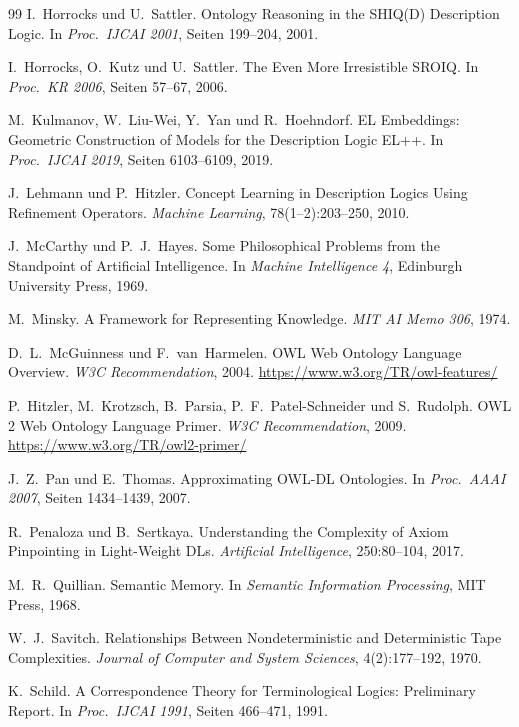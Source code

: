 ﻿\documentclass[a4paper,12pt]{article}
\theoremstyle{definition}
\theoremstyle{plain}
\theoremstyle{remark}
\begin{document}
\begin{thebibliography}{99}
I.~Horrocks und U.~Sattler.
Ontology Reasoning in the SHIQ(D) Description Logic.
In \textit{Proc.\ IJCAI 2001}, Seiten 199--204, 2001.

I.~Horrocks, O.~Kutz und U.~Sattler.
The Even More Irresistible SROIQ.
In \textit{Proc.\ KR 2006}, Seiten 57--67, 2006.

M.~Kulmanov, W.~Liu-Wei, Y.~Yan und R.~Hoehndorf.
EL Embeddings: Geometric Construction of Models for
the Description Logic EL++.
In \textit{Proc.\ IJCAI 2019}, Seiten 6103--6109, 2019.

J.~Lehmann und P.~Hitzler.
Concept Learning in Description Logics Using Refinement Operators.
\textit{Machine Learning}, 78(1--2):203--250, 2010.

J.~McCarthy und P.~J.~Hayes.
Some Philosophical Problems from the Standpoint of
Artificial Intelligence.
In \textit{Machine Intelligence 4}, Edinburgh University Press, 1969.

M.~Minsky.
A Framework for Representing Knowledge.
\textit{MIT AI Memo 306}, 1974.

D.~L.~McGuinness und F.~van~Harmelen.
OWL Web Ontology Language Overview.
\textit{W3C Recommendation}, 2004.
\url{https://www.w3.org/TR/owl-features/}

P.~Hitzler, M.~Krotzsch, B.~Parsia, P.~F.~Patel-Schneider
und S.~Rudolph.
OWL 2 Web Ontology Language Primer.
\textit{W3C Recommendation}, 2009.
\url{https://www.w3.org/TR/owl2-primer/}

J.~Z.~Pan und E.~Thomas.
Approximating OWL-DL Ontologies.
In \textit{Proc.\ AAAI 2007}, Seiten 1434--1439, 2007.

R.~Penaloza und B.~Sertkaya.
Understanding the Complexity of Axiom Pinpointing
in Light-Weight DLs.
\textit{Artificial Intelligence}, 250:80--104, 2017.

M.~R.~Quillian.
Semantic Memory.
In \textit{Semantic Information Processing},
MIT Press, 1968.

W.~J.~Savitch.
Relationships Between Nondeterministic and Deterministic
Tape Complexities.
\textit{Journal of Computer and System Sciences},
4(2):177--192, 1970.

K.~Schild.
A Correspondence Theory for Terminological Logics:
Preliminary Report.
In \textit{Proc.\ IJCAI 1991}, Seiten 466--471, 1991.


\end{thebibliography}
\end{document}
